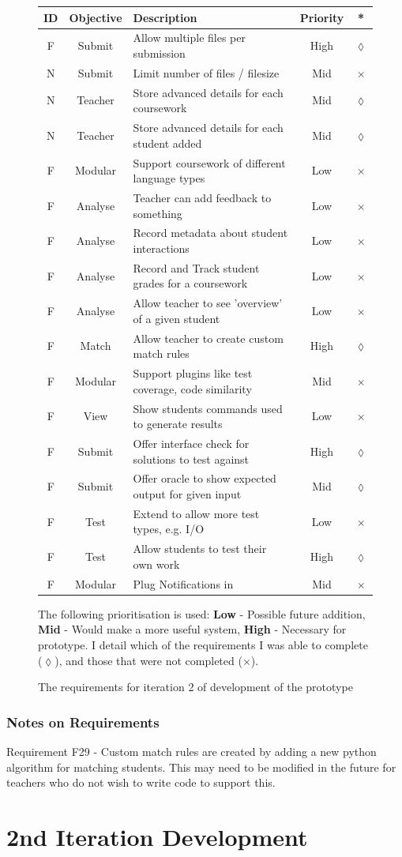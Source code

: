 \documentclass[a4paper,11pt]{report}
\newcounter{FunCount}
\newcounter{NFunCount}
\newcommand{\freq}[4]{\addtocounter{FunCount}{1}F\arabic{FunCount} & #1 & #2 & #3 & #4\\}
\newcommand{\nfreq}[4]{\addtocounter{NFunCount}{1}N\arabic{NFunCount} & #1 & #2 & #3 & #4\\}
\begin{document}
\begin{figure}[hb]
\begin{longtable}{ccl@{}cc}
\textbf{ID} & \textbf{Objective} & \textbf{Description} & \textbf{Priority} & \textbf{*}\\\hline
\freq{Submit}{Allow multiple files per submission}{High}{$\lozenge$}
\nfreq{Submit}{Limit number of files / filesize}{Mid}{$\times$}
\nfreq{Teacher}{Store advanced details for each coursework}{Mid}{$\lozenge$}
\nfreq{Teacher}{Store advanced details for each student added}{Mid}{$\lozenge$}
\freq{Modular}{Support coursework of different language types}{Low}{$\times$}
\freq{Analyse}{Teacher can add feedback to something}{Low}{$\times$}
\freq{Analyse}{Record metadata about student interactions}{Low}{$\times$}
\freq{Analyse}{Record and Track student grades for a coursework}{Low}{$\times$}
\freq{Analyse}{Allow teacher to see 'overview' of a given student}{Low}{$\times$}
\freq{Match}{Allow teacher to create custom match rules}{High}{$\lozenge$}
\freq{Modular}{Support plugins like test coverage, code similarity}{Mid}{$\times$}
\freq{View}{Show students commands used to generate results}{Low}{$\times$}
\freq{Submit}{Offer interface check for solutions to test against}{High}{$\lozenge$}
\freq{Submit}{Offer oracle to show expected output for given input}{Mid}{$\lozenge$}
\freq{Test}{Extend to allow more test types, e.g. I/O}{Low}{$\times$}
\freq{Test}{Allow students to test their own work}{High}{$\lozenge$}
\freq{Modular}{Plug Notifications in}{Mid}{$\times$}
\end{longtable}
\vspace{0.5cm}
The following prioritisation is used: \textbf{Low} - Possible future addition, \textbf{Mid} - Would make a more useful system, \textbf{High} - Necessary for prototype. I detail which of the requirements I was able to complete ($\lozenge$), and those that were not completed ($\times$).
\caption{\label{tab:protoreq2} The requirements for iteration 2 of development of the prototype}
\end{figure}
\subsubsection*{Notes on Requirements}
Requirement F29 - Custom match rules are created by adding a new python algorithm for matching students. This may need to be modified in the future for teachers who do not wish to write code to support this.

\section{2nd Iteration Development}
\end{document}

